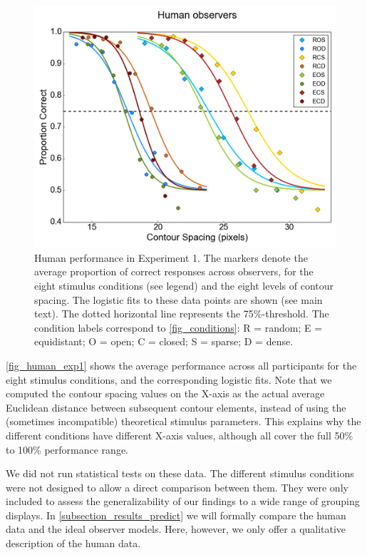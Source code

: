 \documentclass[12pt]{article}
\begin{document}
\begin{figure}[h!t]
\includegraphics{Figures/FIG_detect_data_exp1.png}
\caption{Human performance in Experiment 1. The markers denote the average proportion of correct responses across observers, for the eight stimulus conditions (see legend) and the eight levels of contour spacing. The logistic fits to these data points are shown (see main text). The dotted horizontal line represents the 75\%-threshold. The condition labels correspond to \autoref{fig_conditions}: R = random; E = equidistant; O = open; C = closed; S = sparse; D = dense.}
\label{fig_human_exp1}
\end{figure}

\autoref{fig_human_exp1} shows the average performance across all participants for the eight stimulus conditions, and the corresponding logistic fits. Note that we computed the contour  spacing values on the X-axis as the actual average Euclidean distance between subsequent contour elements, instead of using the (sometimes incompatible) theoretical stimulus parameters. This explains why the different conditions have different X-axis values, although all cover the full 50\% to 100\% performance range.

We did not run statistical tests on these data. The different stimulus conditions were not designed to allow a direct comparison between them. They were only included to assess the generalizability of our findings to a wide range of grouping displays. In \autoref{subsection_results_predict} we will formally compare the human data and the ideal observer models. Here, however, we only offer a qualitative description of the human data.\\
\end{document}
